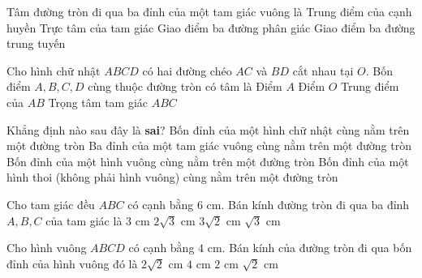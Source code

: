 \begin{ex}%
	Tâm đường tròn đi qua ba đỉnh của một tam giác vuông là
	\choice
	{\True Trung điểm của cạnh huyền}
	{Trực tâm của tam giác}
	{Giao điểm ba đường phân giác}
	{Giao điểm ba đường trung tuyến}
\end{ex}

\begin{ex}%
	Cho hình chữ nhật $ABCD$ có hai đường chéo $AC$ và $BD$ cắt nhau tại $O$. Bốn điểm $A, B, C, D$ cùng thuộc đường tròn có tâm là
	\choice
	{Điểm $A$}
	{\True Điểm $O$}
	{Trung điểm của $AB$}
	{Trọng tâm tam giác $ABC$}
\end{ex}

\begin{ex}%
	Khẳng định nào sau đây là \textbf{sai}?
	\choice
	{Bốn đỉnh của một hình chữ nhật cùng nằm trên một đường tròn}
	{Ba đỉnh của một tam giác vuông cùng nằm trên một đường tròn}
	{Bốn đỉnh của một hình vuông cùng nằm trên một đường tròn}
	{\True Bốn đỉnh của một hình thoi (không phải hình vuông) cùng nằm trên một đường tròn}
\end{ex}

\begin{ex}%
	Cho tam giác đều $ABC$ có cạnh bằng $6\text{ cm}$. Bán kính đường tròn đi qua ba đỉnh $A, B, C$ của tam giác là
	\choice
	{$3\text{ cm}$}
	{\True $2\sqrt{3}\text{ cm}$}
	{$3\sqrt{2}\text{ cm}$}
	{$\sqrt{3}\text{ cm}$}
\end{ex}

\begin{ex}%
	Cho hình vuông $ABCD$ có cạnh bằng $4\text{ cm}$. Bán kính của đường tròn đi qua bốn đỉnh của hình vuông đó là
	\choice
	{\True $2\sqrt{2}\text{ cm}$}
	{$4\text{ cm}$}
	{$2\text{ cm}$}
	{$\sqrt{2}\text{ cm}$}
\end{ex}

